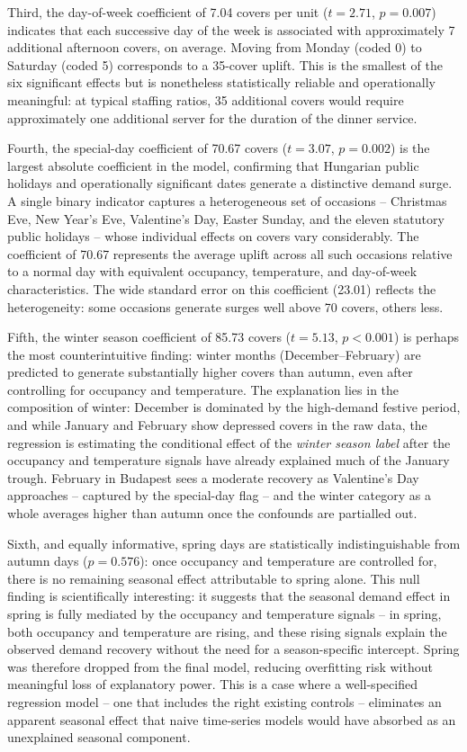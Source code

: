 \documentclass[12pt,a4paper,oneside]{article}
\begin{document}
Third, the day-of-week coefficient of 7.04 covers per unit ($t = 2.71$, $p = 0.007$) indicates that each successive day of the week is associated with approximately 7 additional afternoon covers, on average. Moving from Monday (coded 0) to Saturday (coded 5) corresponds to a 35-cover uplift. This is the smallest of the six significant effects but is nonetheless statistically reliable and operationally meaningful: at typical staffing ratios, 35 additional covers would require approximately one additional server for the duration of the dinner service.

Fourth, the special-day coefficient of 70.67 covers ($t = 3.07$, $p = 0.002$) is the largest absolute coefficient in the model, confirming that Hungarian public holidays and operationally significant dates generate a distinctive demand surge. A single binary indicator captures a heterogeneous set of occasions -- Christmas Eve, New Year's Eve, Valentine's Day, Easter Sunday, and the eleven statutory public holidays -- whose individual effects on covers vary considerably. The coefficient of 70.67 represents the average uplift across all such occasions relative to a normal day with equivalent occupancy, temperature, and day-of-week characteristics. The wide standard error on this coefficient (23.01) reflects the heterogeneity: some occasions generate surges well above 70 covers, others less.

Fifth, the winter season coefficient of 85.73 covers ($t = 5.13$, $p < 0.001$) is perhaps the most counterintuitive finding: winter months (December--February) are predicted to generate substantially higher covers than autumn, even after controlling for occupancy and temperature. The explanation lies in the composition of winter: December is dominated by the high-demand festive period, and while January and February show depressed covers in the raw data, the regression is estimating the conditional effect of the \textit{winter season label} after the occupancy and temperature signals have already explained much of the January trough. February in Budapest sees a moderate recovery as Valentine's Day approaches -- captured by the special-day flag -- and the winter category as a whole averages higher than autumn once the confounds are partialled out.

Sixth, and equally informative, spring days are statistically indistinguishable from autumn days ($p = 0.576$): once occupancy and temperature are controlled for, there is no remaining seasonal effect attributable to spring alone. This null finding is scientifically interesting: it suggests that the seasonal demand effect in spring is fully mediated by the occupancy and temperature signals -- in spring, both occupancy and temperature are rising, and these rising signals explain the observed demand recovery without the need for a season-specific intercept. Spring was therefore dropped from the final model, reducing overfitting risk without meaningful loss of explanatory power. This is a case where a well-specified regression model -- one that includes the right existing controls -- eliminates an apparent seasonal effect that naive time-series models would have absorbed as an unexplained seasonal component.
\end{document}
